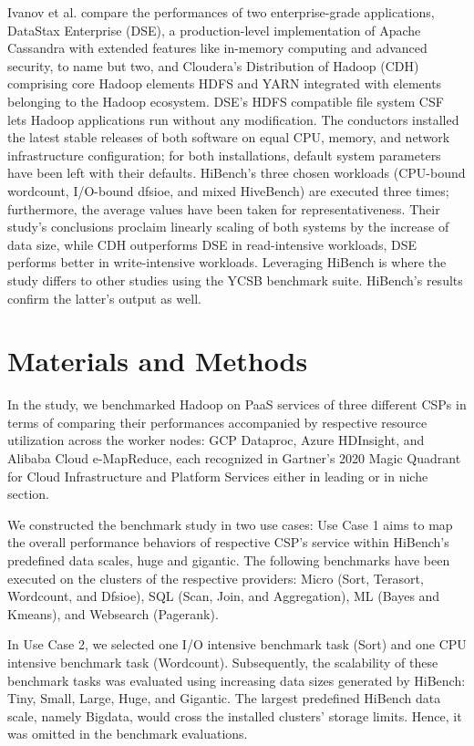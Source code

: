 \documentclass[review]{elsarticle}
\begin{document}
	Ivanov et al. \cite{ivanov_performance_2015} compare the performances of two enterprise-grade applications, DataStax Enterprise (DSE), a production-level implementation of Apache Cassandra with extended features like in-memory computing and advanced security, to name but two, and Cloudera's Distribution of Hadoop (CDH) comprising core Hadoop elements HDFS and YARN integrated with elements belonging to the Hadoop ecosystem. DSE's HDFS compatible file system CSF lets Hadoop applications run without any modification. The conductors installed the latest stable releases of both software on equal CPU, memory, and network infrastructure configuration; for both installations, default system parameters have been left with their defaults. HiBench's three chosen workloads (CPU-bound wordcount, I/O-bound dfsioe, and mixed HiveBench) are executed three times; furthermore, the average values have been taken for representativeness. Their study's conclusions proclaim linearly scaling of both systems by the increase of data size, while CDH outperforms DSE in read-intensive workloads, DSE performs better in write-intensive workloads. Leveraging HiBench is where the study differs to other studies using the YCSB benchmark suite. HiBench's results confirm the latter's output as well.
	
	
	
	\section{Materials and Methods}
	In the study, we benchmarked Hadoop on PaaS services of three different CSPs in terms of comparing their performances accompanied by respective resource utilization across the worker nodes: GCP Dataproc, Azure HDInsight, and Alibaba Cloud e-MapReduce, each recognized in Gartner's 2020 Magic Quadrant for Cloud Infrastructure and Platform Services \cite{noauthor_gartner_nodate} either in leading or in niche section.
	
	We constructed the benchmark study in two use cases: Use Case 1 aims to map the overall performance behaviors of respective CSP's service within HiBench's predefined data scales, huge and gigantic. The following benchmarks have been executed on the clusters of the respective providers: Micro (Sort, Terasort, Wordcount, and Dfsioe), SQL (Scan, Join, and Aggregation), ML (Bayes and Kmeans), and Websearch (Pagerank).
	
	In Use Case 2, we selected one I/O intensive benchmark task (Sort) and one CPU intensive benchmark task (Wordcount). Subsequently, the scalability of these benchmark tasks was evaluated using increasing data sizes generated by HiBench: Tiny, Small, Large, Huge, and Gigantic. The largest predefined HiBench data scale, namely Bigdata, would cross the installed clusters' storage limits. Hence, it was omitted in the benchmark evaluations.
	
\end{document}
